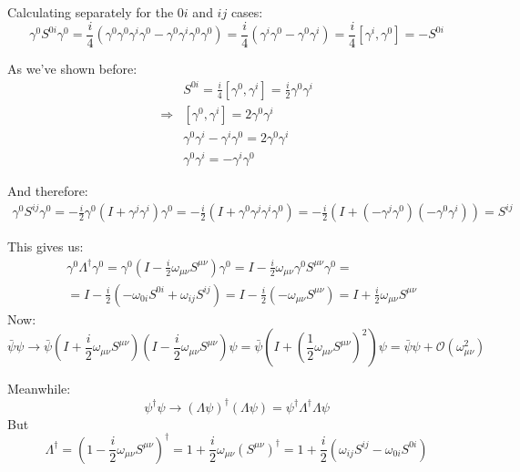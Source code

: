 \documentclass[11pt]{article}
\begin{document}
Calculating separately for the $0i$ and $ij$ cases:
$$\gamma^0S^{0i}\gamma^0 = \frac{i}{4}(\gamma^0 \gamma^0 \gamma^i \gamma^0 - \gamma^0 \gamma^i \gamma^0 \gamma^0) = \frac{i}{4}(\gamma^i\gamma^0-\gamma^0\gamma^i)=\frac{i}{4}[\gamma^i,\gamma^0]= -S^{0i}$$

As we've shown before:
\begin{equation}
\begin{split}
    &S^{0i}=\frac{i}{4}[\gamma^0,\gamma^i]= \frac{i}{2}\gamma^0\gamma^i\\
    \Rightarrow &[\gamma^0,\gamma^i]=2\gamma^0\gamma^i\\
    &\gamma^0\gamma^i-\gamma^i\gamma^0 = 2\gamma^0\gamma^i\\
    &\gamma^0\gamma^i = -\gamma^i\gamma^0
\end{split}
\end{equation}

And therefore:
\begin{equation}
\begin{split}
    \gamma^0 S^{ij}\gamma^0 = 
    -\frac{i}{2}\gamma^0(I+\gamma^j\gamma^i)\gamma^0=
    -\frac{i}{2}(I+\gamma^0\gamma^j\gamma^i\gamma^0)=
    -\frac{i}{2}(I+(-\gamma^j\gamma^0)(-\gamma^0\gamma^i))=
    S^{ij}
\end{split}
\end{equation}

This gives us:
\begin{equation}
\begin{split}
    &\gamma^0\Lambda^\dagger\gamma^0 = \gamma^0\left(I-\frac{i}{2}\omega_{\mu\nu}S^{\mu\nu} \right)\gamma^0 = 
    I-\frac{i}{2}\omega_{\mu\nu}\gamma^0 S^{\mu\nu}\gamma^0 =\\
    &=I-\frac{i}{2}\left(-\omega_{0i}S^{0i} + \omega_{ij}S^{ij}  \right) = I - \frac{i}{2}( - \omega_{\mu\nu}S^{\mu\nu})=I+ \frac{i}{2}\omega_{\mu\nu}S^{\mu\nu}
\end{split}
\end{equation}
Now: 
\begin{equation}
    \bar\psi\psi\to \bar\psi\left(I+\frac{i}{2}\omega_{\mu\nu}S^{\mu\nu} \right)\left(I-\frac{i}{2}\omega_{\mu\nu}S^{\mu\nu} \right)\psi = 
    \bar\psi\left( I + \left(\frac{1}{2}\omega_{\mu\nu}S^{\mu\nu} \right)^2\right)\psi = \bar\psi\psi + \mathcal O(\omega_{\mu\nu}^2)
\end{equation}

Meanwhile:
$$\psi^\dagger\psi\to (\Lambda\psi)^\dagger(\Lambda\psi)=\psi^\dagger\Lambda^\dagger\Lambda\psi  $$
But 
$$\Lambda^\dagger=(1-\frac{i}{2}\omega_{\mu\nu} S^{\mu\nu})^\dagger=1+\frac{i}{2}\omega_{\mu\nu}(S^{\mu\nu})^\dagger =1 + \frac{i}{2}(\omega_{ij}S^{ij}-\omega_{0i}S^{0i})$$
\end{document}
